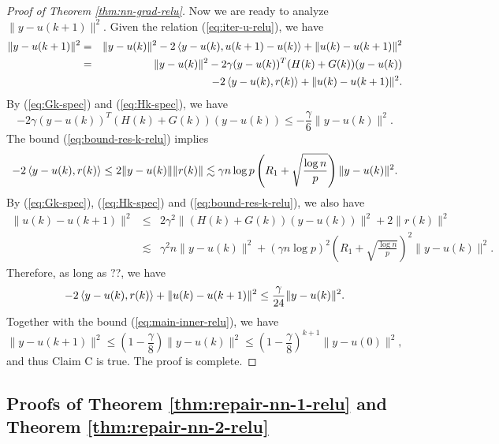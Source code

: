 \begin{proof}[Proof of Theorem \ref{thm:nn-grad-relu}]
Now we are ready to analyze $\|y-u(k+1)\|^2$. Given the relation (\ref{eq:iter-u-relu}), we have
\begin{eqnarray*}
\|y-u(k+1)\|^2 &=& \|y-u(k)\|^2 - 2\iprod{y-u(k)}{u(k+1)-u(k)} + \|u(k)-u(k+1)\|^2 \\
&=& \|y-u(k)\|^2 - 2\gamma(y-u(k))^T(H(k)+G(k))(y-u(k)) \\
&& - 2\iprod{y-u(k)}{r(k)} + \|u(k)-u(k+1)\|^2.
\end{eqnarray*}
By (\ref{eq:Gk-spec}) and (\ref{eq:Hk-spec}), we have
\begin{equation}
- 2\gamma(y-u(k))^T(H(k)+G(k))(y-u(k)) \leq -\frac{\gamma}{6}\|y-u(k)\|^2. \label{eq:main-inner-relu}
\end{equation}
The bound (\ref{eq:bound-res-k-relu}) implies
$$- 2\left \langle y-u(k), r(k) \right\rangle\leq 2\|y-u(k)\|\|r(k)\|\lesssim \gamma n\log p\left(R_1+\sqrt{\frac{\log n}{p}}\right)\|y-u(k)\|^2.$$
By (\ref{eq:Gk-spec}), (\ref{eq:Hk-spec}) and (\ref{eq:bound-res-k-relu}), we also have
\begin{eqnarray*}
\|u(k)-u(k+1)\|^2 &\leq& 2\gamma^2\|(H(k)+G(k))(y-u(k))\|^2 + 2\|r(k)\|^2 \\
&\lesssim& \gamma^2n\|y-u(k)\|^2 + (\gamma n\log p)^2\left(R_1+\sqrt{\frac{\log n}{p}}\right)^2\|y-u(k)\|^2 .
\end{eqnarray*}
Therefore, as long as ??, we have
$$- 2\left \langle y-u(k), r(k) \right\rangle + \|u(k)-u(k+1)\|^2 \leq \frac{\gamma}{24}\|y-u(k)\|^2.$$
Together with the bound (\ref{eq:main-inner-relu}), we have
$$\|y-u(k+1)\|^2 \leq \left(1-\frac{\gamma}{8}\right)\|y-u(k)\|^2\leq \left(1-\frac{\gamma}{8}\right)^{k+1}\|y-u(0)\|^2,$$
and thus Claim C is true. The proof is complete.
\end{proof}


\subsection{Proofs of Theorem \ref{thm:repair-nn-1-relu} and Theorem \ref{thm:repair-nn-2-relu}}

